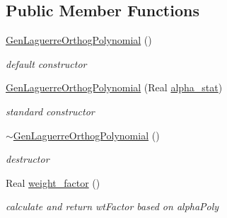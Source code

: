 \subsection*{Public Member Functions}
\begin{DoxyCompactItemize}
\item 
\hyperlink{classPecos_1_1GenLaguerreOrthogPolynomial_a7a03d67906e4ef2afc868a23e93fd8b6}{Gen\+Laguerre\+Orthog\+Polynomial} ()\label{classPecos_1_1GenLaguerreOrthogPolynomial_a7a03d67906e4ef2afc868a23e93fd8b6}

\begin{DoxyCompactList}\small\item\em default constructor \end{DoxyCompactList}\item 
\hyperlink{classPecos_1_1GenLaguerreOrthogPolynomial_a2c97d43396fd28eb6040b943292959c0}{Gen\+Laguerre\+Orthog\+Polynomial} (Real \hyperlink{classPecos_1_1GenLaguerreOrthogPolynomial_aeeb4ce11a8d413209be1ec08eced8728}{alpha\+\_\+stat})\label{classPecos_1_1GenLaguerreOrthogPolynomial_a2c97d43396fd28eb6040b943292959c0}

\begin{DoxyCompactList}\small\item\em standard constructor \end{DoxyCompactList}\item 
\hyperlink{classPecos_1_1GenLaguerreOrthogPolynomial_a9d104277bc7d830f1ae5833c8809a7b0}{$\sim$\+Gen\+Laguerre\+Orthog\+Polynomial} ()\label{classPecos_1_1GenLaguerreOrthogPolynomial_a9d104277bc7d830f1ae5833c8809a7b0}

\begin{DoxyCompactList}\small\item\em destructor \end{DoxyCompactList}\item 
Real \hyperlink{classPecos_1_1GenLaguerreOrthogPolynomial_acc5475d6b992e443e3cce753a48cfc32}{weight\+\_\+factor} ()\label{classPecos_1_1GenLaguerreOrthogPolynomial_acc5475d6b992e443e3cce753a48cfc32}

\begin{DoxyCompactList}\small\item\em calculate and return wt\+Factor based on alpha\+Poly \end{DoxyCompactList}\end{DoxyCompactItemize}
